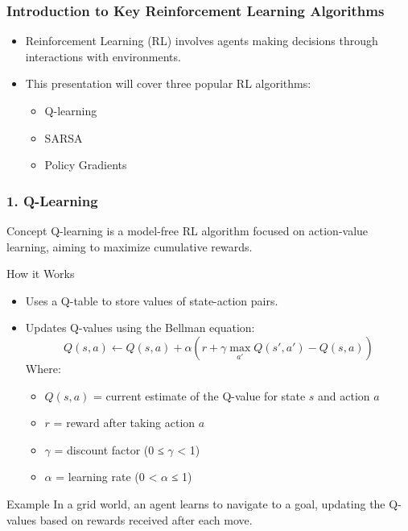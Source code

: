 \documentclass{beamer}
\begin{document}
\begin{frame}[fragile]
    \frametitle{Introduction to Key Reinforcement Learning Algorithms}
    \begin{itemize}
        \item Reinforcement Learning (RL) involves agents making decisions through interactions with environments.
        \item This presentation will cover three popular RL algorithms:
        \begin{itemize}
            \item Q-learning
            \item SARSA
            \item Policy Gradients
        \end{itemize}
    \end{itemize}
\end{frame}

\begin{frame}[fragile]
    \frametitle{1. Q-Learning}
    \begin{block}{Concept}
        Q-learning is a model-free RL algorithm focused on action-value learning, aiming to maximize cumulative rewards.
    \end{block}
    
    \begin{block}{How it Works}
        \begin{itemize}
            \item Uses a Q-table to store values of state-action pairs.
            \item Updates Q-values using the Bellman equation:
            \begin{equation}
            Q(s, a) \gets Q(s, a) + \alpha \left( r + \gamma \max_{a'} Q(s', a') - Q(s, a) \right)
            \end{equation}
            Where:
            \begin{itemize}
                \item $Q(s, a)$ = current estimate of the Q-value for state $s$ and action $a$
                \item $r$ = reward after taking action $a$
                \item $\gamma$ = discount factor (0 ≤ $\gamma$ < 1)
                \item $\alpha$ = learning rate (0 < $\alpha$ ≤ 1)
            \end{itemize}
        \end{itemize}
    \end{block}
    
    \begin{block}{Example}
        In a grid world, an agent learns to navigate to a goal, updating the Q-values based on rewards received after each move.
    \end{block}
\end{frame}
\end{document}
